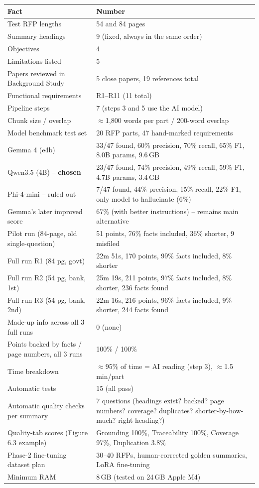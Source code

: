 \documentclass[11pt,a4paper]{article}
\begin{document}
\begin{longtable}{@{}p{7.2cm}p{7.2cm}@{}}
\toprule
\textbf{Fact} & \textbf{Number}\\
\midrule
\endhead
Test RFP lengths & 54 and 84 pages\\
Summary headings & 9 (fixed, always in the same order)\\
Objectives & 4\\
Limitations listed & 5\\
Papers reviewed in Background Study & 5 close papers, 19 references total\\
Functional requirements & R1--R11 (11 total)\\
Pipeline steps & 7 (steps 3 and 5 use the AI model)\\
Chunk size / overlap & $\approx$1{,}800 words per part / 200-word overlap\\
Model benchmark test set & 20 RFP parts, 47 hand-marked requirements\\
Gemma 4 (e4b) & 33/47 found, 60\% precision, 70\% recall, 65\% F1, 8.0B params, 9.6\,GB\\
Qwen3.5 (4B) -- \textbf{chosen} & 23/47 found, 74\% precision, 49\% recall, 59\% F1, 4.7B params, 3.4\,GB\\
Phi-4-mini -- ruled out & 7/47 found, 44\% precision, 15\% recall, 22\% F1, only model to hallucinate (6\%)\\
Gemma's later improved score & 67\% (with better instructions) -- remains main alternative\\
Pilot run (84-page, old single-question) & 51 points, 76\% facts included, 36\% shorter, 9 misfiled\\
Full run R1 (84 pg, govt) & 22m 51s, 170 points, 99\% facts included, 8\% shorter\\
Full run R2 (54 pg, bank, 1st) & 25m 19s, 211 points, 97\% facts included, 8\% shorter, 236 facts found\\
Full run R3 (54 pg, bank, 2nd) & 22m 16s, 216 points, 96\% facts included, 9\% shorter, 244 facts found\\
Made-up info across all 3 full runs & 0 (none)\\
Points backed by facts / page numbers, all 3 runs & 100\% / 100\%\\
Time breakdown & $\approx$95\% of time = AI reading (step 3), $\approx$1.5 min/part\\
Automatic tests & 15 (all pass)\\
Automatic quality checks per summary & 7 questions (headings exist? backed? page numbers? coverage?
  duplicates? shorter-by-how-much? right heading?)\\
Quality-tab scores (Figure 6.3 example) & Grounding 100\%, Traceability 100\%, Coverage 97\%,
  Duplication 3.8\%\\
Phase-2 fine-tuning dataset plan & 30--40 RFPs, human-corrected golden summaries, LoRA fine-tuning\\
Minimum RAM & 8\,GB (tested on 24\,GB Apple M4)\\
\bottomrule
\end{longtable}
\end{document}
